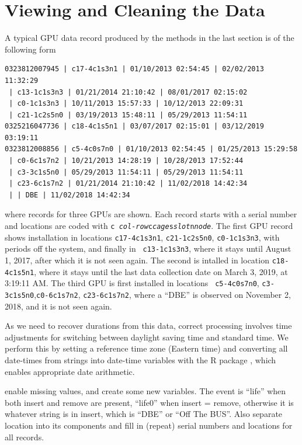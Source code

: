 \section{Viewing and Cleaning the Data}
\label{sec:clean}

A typical GPU data record produced by the methods in the last section
is of the following form
{\small
\begin{verbatim}
0323812007945 | c17-4c1s3n1 | 01/10/2013 02:54:45 | 02/02/2013 11:32:29
 | c13-1c1s3n3 | 01/21/2014 21:10:42 | 08/01/2017 02:15:02
 | c0-1c1s3n3 | 10/11/2013 15:57:33 | 10/12/2013 22:09:31
 | c21-1c2s5n0 | 03/19/2013 15:48:11 | 05/29/2013 11:54:11
0325216047736 | c18-4c1s5n1 | 03/07/2017 02:15:01 | 03/12/2019 03:19:11
0323812008856 | c5-4c0s7n0 | 01/10/2013 02:54:45 | 01/25/2013 15:29:58
 | c0-6c1s7n2 | 10/21/2013 14:28:19 | 10/28/2013 17:52:44
 | c3-3c1s5n0 | 05/29/2013 11:54:11 | 05/29/2013 11:54:11
 | c23-6c1s7n2 | 01/21/2014 21:10:42 | 11/02/2018 14:42:34
 | | DBE | 11/02/2018 14:42:34
\end{verbatim}
}
\noindent where records for three GPUs are shown. Each record starts
with a serial number and locations are coded with {\tt c{\it
    col-row}c{\it cage}s{\it slot}n{\it node}}. The first GPU record
shows installation in locations {\tt c17-4c1s3n1}, {\tt c21-1c2s5n0},
{\tt c0-1c1s3n3}, with periods off the system, and finally in {\tt
  c13-1c1s3n3}, where it stays until August 1, 2017, after which it is
not seen again. The second is intalled in location {\tt c18-4c1s5n1},
where it stays until the last data collection date on March 3, 2019,
at 3:19:11 AM. The third GPU is first installed in locations {\tt
  c5-4c0s7n0}, {\tt c3-3c1s5n0},{\tt c0-6c1s7n2}, {\tt c23-6c1s7n2},
where a ``DBE'' is observed on November 2, 2018, and it is not seen
again.

As we need to recover durations from this data, correct processing
involves time adjustments for switching between daylight saving time
and standard time. We perform this by setting a reference time zone
(Eastern time) and converting all date-times from strings into
date-time variables  with the R
 package \cite{lubridate}, which enables appropriate
date arithmetic.

 enable missing values, and create some new
variables. The event is “life” when both insert and remove are
present, “life0” when insert = remove, otherwise it is whatever string
is in insert, which is “DBE” or “Off The BUS”. Also separate location
into its components and fill in (repeat) serial numbers and locations
for all records.

